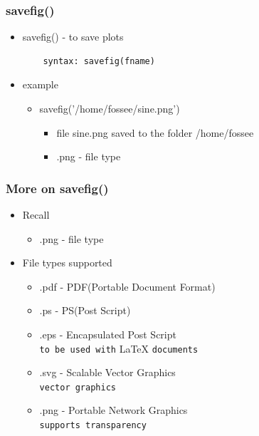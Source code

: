 \documentclass[presentation]{beamer}
\begin{document}
\begin{frame}[fragile]
\frametitle{savefig()}
\label{sec-4}
\begin{itemize}

\item savefig() - to save plots
\label{sec-4_1}%
\begin{verbatim}
    syntax: savefig(fname)
\end{verbatim}


\item example
\label{sec-4_2}%
\begin{itemize}

\item savefig('/home/fossee/sine.png')\\
\label{sec-4_2_1}%
\begin{itemize}
\item file sine.png saved to the folder /home/fossee
\item .png - file type
\end{itemize}

\end{itemize} %
\end{itemize} %
\end{frame}
\begin{frame}
\frametitle{More on savefig()}
\label{sec-5}
\begin{itemize}

\item Recall\\
\label{sec-5_1}%
\begin{itemize}
\item .png - file type
\end{itemize}

\item File types supported
\label{sec-5_2}%
\begin{itemize}

\item .pdf - PDF(Portable Document Format)\\
\label{sec-5_2_1}%
\item .ps - PS(Post Script)\\
\label{sec-5_2_2}%
\item .eps - Encapsulated Post Script\\
\label{sec-5_2_3}%
\verb~to be used with~ \LaTeX{} \verb~documents~

\item .svg - Scalable Vector Graphics\\
\label{sec-5_2_4}%
\verb~vector graphics~

\item .png - Portable Network Graphics\\
\label{sec-5_2_5}%
\verb~supports transparency~
\end{itemize} %
\end{itemize} %
\end{frame}
\end{document}
